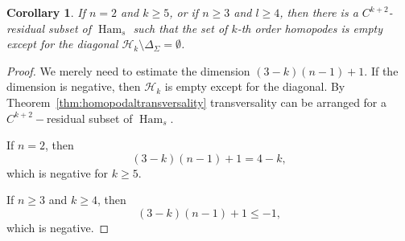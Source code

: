 \documentclass[10pt,a4paper]{amsart}
\newtheorem{corollary}{Corollary}
\newcommand{\Ham}{\operatorname{Ham}}
\newcommand{\Hcal}{{\mathcal{H}}}
\begin{document}
\begin{corollary}\label{cor:dimensioncount}
    If $n=2$ and $k\geq 5$, or if $n\geq 3$ and $l\geq 4$, then there is a $C^{k+2}$-residual subset of $\Ham_s$ such that the set of $k$-th order homopodes is empty except for the diagonal $\Hcal_k\setminus\Delta_{\Sigma}=\emptyset$.
\end{corollary}

\begin{proof}
    We merely need to estimate the dimension $(3-k)(n-1)+1$. If the dimension is negative, then $\Hcal_k$ is empty except for the diagonal. By Theorem~\ref{thm:homopodaltransversality} transversality can be arranged for a $C^{k+2}-$residual subset of $\Ham_s$.
    
    If $n=2$, then 
    $$(3-k)(n-1)+1=4-k,$$
    which is negative for $k\geq 5$. 

    If $n\geq 3$ and $k\geq 4$, then 
    $$(3-k)(n-1)+1 \leq -1,$$
    which is negative. 
\end{proof}
\end{document}
